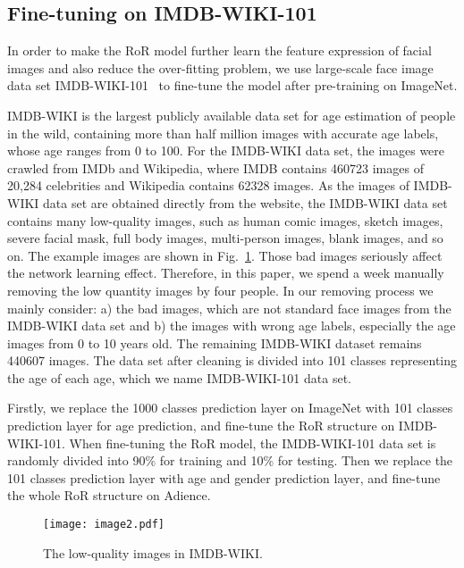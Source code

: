 \documentclass[journal]{IEEEtran}
\begin{document}
\subsection{Fine-tuning on IMDB-WIKI-101}
In order to make the RoR model further learn the feature expression of facial images and also reduce the over-fitting problem, we use large-scale face image data set IMDB-WIKI-101~\cite{Dex} to fine-tune the model after pre-training on ImageNet. 
\par
IMDB-WIKI is the largest publicly available data set for age estimation of people in the wild, containing more than half million images with accurate age labels, whose age ranges from 0 to 100. For the IMDB-WIKI data set, the images were crawled from IMDb and Wikipedia, where IMDB contains 460723 images of 20,284 celebrities and Wikipedia contains 62328 images. As the images of IMDB-WIKI data set are obtained directly from the website, the IMDB-WIKI data set contains many low-quality images, such as human comic images, sketch images, severe facial mask, full body images, multi-person images, blank images, and so on. The example images are shown in Fig.~\ref{fig:image2}. Those bad images seriously affect the network learning effect. Therefore, in this paper, we spend a week manually removing the low quantity images by four people. In our removing process we mainly consider: a) the bad images, which are not standard face images from the IMDB-WIKI data set and b) the images with wrong age labels, especially the age images from 0 to 10 years old. The remaining IMDB-WIKI dataset remains 440607 images. The data set after cleaning is divided into 101 classes representing the age of each age, which we name IMDB-WIKI-101 data set. 
\par
Firstly, we replace the 1000 classes prediction layer on ImageNet with 101 classes prediction layer for age prediction, and fine-tune the RoR structure on IMDB-WIKI-101. When fine-tuning the RoR model, the IMDB-WIKI-101 data set is randomly divided into 90\% for training and 10\% for testing. Then we replace the 101 classes prediction layer with age and gender prediction layer, and fine-tune the whole RoR structure on Adience. 

\begin{figure}
\centering
\texttt{[image: image2.pdf]}
\caption{The low-quality images in IMDB-WIKI.}
\label{fig:image2}
\end{figure}
\end{document}
